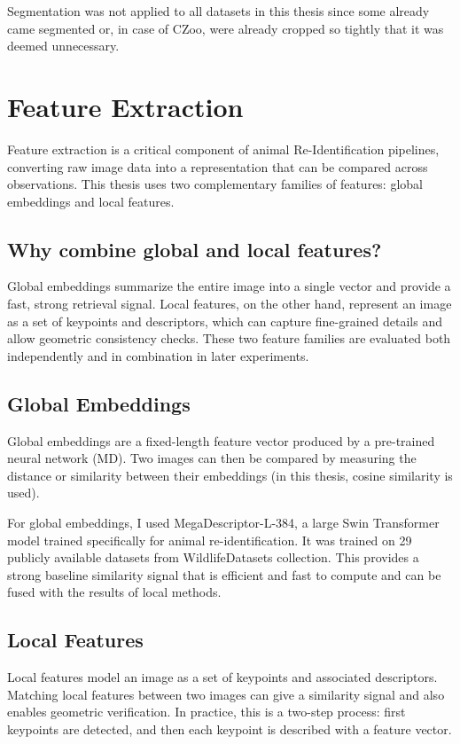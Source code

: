 Segmentation was not applied to all datasets in this thesis since some already came segmented or, in case of CZoo, were already cropped so tightly that it was deemed unnecessary. 

\section{Feature Extraction}
\label{sec:feature_extraction}
Feature extraction is a critical component of animal Re-Identification pipelines, converting raw image data into a representation that can be compared across observations. This thesis uses two complementary families of features: global embeddings and local features.

\subsection{Why combine global and local features?}
Global embeddings summarize the entire image into a single vector and provide a fast, strong retrieval signal. Local features, on the other hand, represent an image as a set of keypoints and descriptors, which can capture fine-grained details and allow geometric consistency checks. These two feature families are evaluated both independently and in combination in later experiments.

\subsection{Global Embeddings}
\label{subsec:global_embeddings}

Global embeddings are a fixed-length feature vector produced by a pre-trained neural network (MD). Two images can then be compared by measuring the distance or similarity between their embeddings (in this thesis, cosine similarity is used).

For global embeddings, I used MegaDescriptor-L-384\cite{čermák2023wildlifedatasetsopensourcetoolkitanimal}, a large Swin Transformer model trained specifically for animal re-identification. It was trained on 29 publicly available datasets from WildlifeDatasets collection\cite{čermák2023wildlifedatasetsopensourcetoolkitanimal}. This provides a strong baseline similarity signal that is efficient and fast to compute and can be fused with the results of local methods.\cite{cermak2024wildfusionindividualanimalidentification}

\subsection{Local Features}
\label{subsec:local_feature_detection}
Local features model an image as a set of keypoints and associated descriptors. Matching local features between two images can give a similarity signal and also enables geometric verification. In practice, this is a two-step process: first keypoints are detected, and then each keypoint is described with a feature vector.

